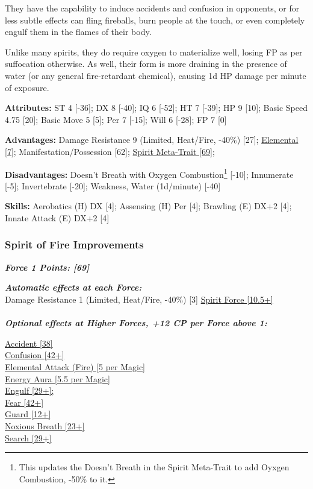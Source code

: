 \begin{multicols}{3}
	They have the capability to induce accidents and confusion in opponents, or for less subtle effects can fling fireballs, burn people at the touch, or even completely engulf them in the flames of their body.
	
	Unlike many spirits, they do require oxygen to materialize well, losing FP as per suffocation otherwise. As well, their form is more draining in the presence of water (or any general fire-retardant chemical), causing 1d HP damage per minute of exposure.
	
	\textbf{Attributes:}
	ST 4 [-36]; DX 8 [-40]; IQ 6 [-52]; HT 7 [-39]; HP 9 [10]; Basic Speed 4.75 [20]; Basic Move 5 [5]; Per 7 [-15]; Will 6 [-28]; FP 7 [0]
	
	\textbf{Advantages:}
	Damage Resistance 9 (Limited, Heat/Fire, -40\%) [27]; \hyperref[elemental]{Elemental [7]}; Manifestation/Possession [62]; \hyperref[spirit_meta_trait]{Spirit Meta-Trait [69]};
	
	\textbf{Disadvantages:}
	Doesn't Breath with Oxygen Combustion\footnote{This updates the Doesn't Breath in the Spirit Meta-Trait to add Oyxgen Combustion, -50\% to it.} [-10]; Innumerate [-5]; Invertebrate [-20]; Weakness, Water (1d/minute) [-40]
	
	\textbf{Skills:}
	Aerobatics (H) DX [4]; Assensing (H) Per [4]; Brawling (E) DX+2 [4]; Innate Attack (E) DX+2 [4]
	
	\subsubsection*{Spirit of Fire Improvements}
	
	\textbf{\textit{Force 1 Points: [69]}}
	
	\textbf{\textit{Automatic effects at each Force:\\}}
	Damage Resistance 1 (Limited, Heat/Fire, -40\%) [3]	
	\hyperref[spirit_force]{Spirit Force [10.5+]}\\\\
	
	\textbf{\textit{Optional effects at Higher Forces, +12 CP per Force above 1:\\}}
	
	\hyperref[accident]{Accident [38]}\\
	\hyperref[confusion]{Confusion [42+]}\\
	\hyperref[elemental_attack]{Elemental Attack (Fire) [5 per Magic]}\\
	\hyperref[energy_aura]{Energy Aura [5.5 per Magic]}\\
	\hyperref[engulf]{Engulf [29+];}\\	
	\hyperref[fear]{Fear [42+]}\\
	\hyperref[guard]{Guard [12+]}\\
	\hyperref[noxious_breath]{Noxious Breath [23+]}\\
	\hyperref[search]{Search [29+]}\\	
	

\end{multicols}
